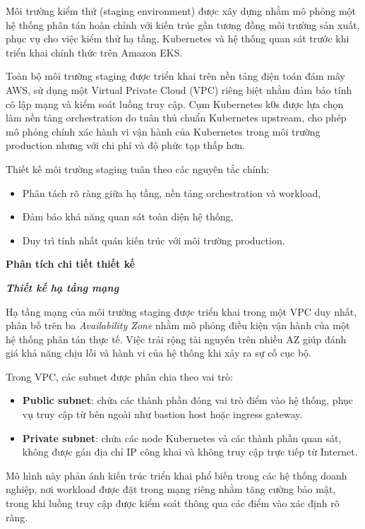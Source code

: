 Môi trường kiểm thử (staging environment) được xây dựng nhằm mô phỏng một hệ thống 
phân tán hoàn chỉnh với kiến trúc gần tương đồng môi trường sản xuất, phục vụ cho 
việc kiểm thử hạ tầng, Kubernetes và hệ thống quan sát trước khi triển khai chính 
thức trên Amazon EKS.

Toàn bộ môi trường staging được triển khai trên nền tảng điện toán đám mây AWS, 
sử dụng một Virtual Private Cloud (VPC) riêng biệt nhằm đảm bảo tính cô lập mạng 
và kiểm soát luồng truy cập. Cụm Kubernetes k0s được lựa chọn làm nền tảng orchestration 
do tuân thủ chuẩn Kubernetes upstream, cho phép mô phỏng chính xác hành vi vận hành 
của Kubernetes trong môi trường production nhưng với chi phí và độ phức tạp thấp hơn.

Thiết kế môi trường staging tuân theo các nguyên tắc chính:
\begin{itemize}
    \item Phân tách rõ ràng giữa hạ tầng, nền tảng orchestration và workload,
    \item Đảm bảo khả năng quan sát toàn diện hệ thống,
    \item Duy trì tính nhất quán kiến trúc với môi trường production.
\end{itemize}

\textbf{Phân tích chi tiết thiết kế}

\textit{\textbf{Thiết kế hạ tầng mạng}}

Hạ tầng mạng của môi trường staging được triển khai trong một VPC duy nhất, 
phân bố trên ba \textit{Availability Zone} nhằm mô phỏng điều kiện vận hành 
của một hệ thống phân tán thực tế. Việc trải rộng tài nguyên trên nhiều AZ 
giúp đánh giá khả năng chịu lỗi và hành vi của hệ thống khi xảy ra sự cố cục bộ.

Trong VPC, các subnet được phân chia theo vai trò:
\begin{itemize}
    \item \textbf{Public subnet}: chứa các thành phần đóng vai trò điểm vào hệ thống, 
    phục vụ truy cập từ bên ngoài như bastion host hoặc ingress gateway.
    \item \textbf{Private subnet}: chứa các node Kubernetes và các thành phần quan sát, 
    không được gán địa chỉ IP công khai và không truy cập trực tiếp từ Internet.
\end{itemize}

Mô hình này phản ánh kiến trúc triển khai phổ biến trong các hệ thống doanh nghiệp, 
nơi workload được đặt trong mạng riêng nhằm tăng cường bảo mật, trong khi luồng truy cập 
được kiểm soát thông qua các điểm vào xác định rõ ràng.

